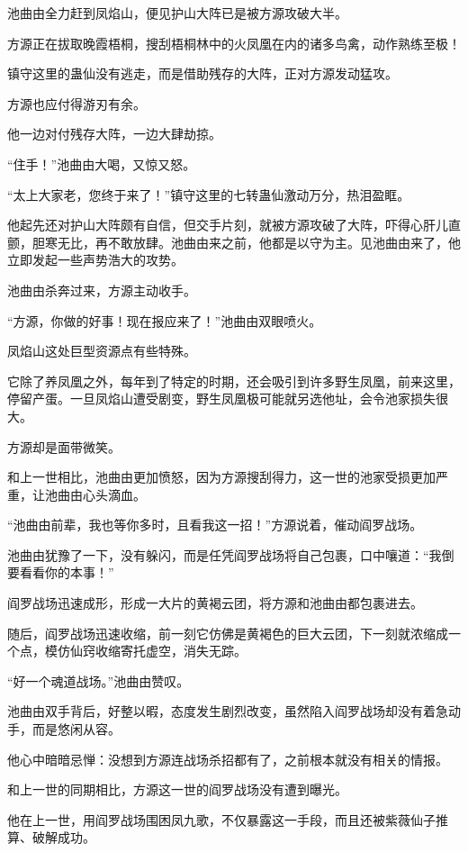 
\begin{this_body}

池曲由全力赶到凤焰山，便见护山大阵已是被方源攻破大半。

方源正在拔取晚霞梧桐，搜刮梧桐林中的火凤凰在内的诸多鸟禽，动作熟练至极！

镇守这里的蛊仙没有逃走，而是借助残存的大阵，正对方源发动猛攻。

方源也应付得游刃有余。

他一边对付残存大阵，一边大肆劫掠。

“住手！”池曲由大喝，又惊又怒。

“太上大家老，您终于来了！”镇守这里的七转蛊仙激动万分，热泪盈眶。

他起先还对护山大阵颇有自信，但交手片刻，就被方源攻破了大阵，吓得心肝儿直颤，胆寒无比，再不敢放肆。池曲由来之前，他都是以守为主。见池曲由来了，他立即发起一些声势浩大的攻势。

池曲由杀奔过来，方源主动收手。

“方源，你做的好事！现在报应来了！”池曲由双眼喷火。

凤焰山这处巨型资源点有些特殊。

它除了养凤凰之外，每年到了特定的时期，还会吸引到许多野生凤凰，前来这里，停留产蛋。一旦凤焰山遭受剧变，野生凤凰极可能就另选他址，会令池家损失很大。

方源却是面带微笑。

和上一世相比，池曲由更加愤怒，因为方源搜刮得力，这一世的池家受损更加严重，让池曲由心头滴血。

“池曲由前辈，我也等你多时，且看我这一招！”方源说着，催动阎罗战场。

池曲由犹豫了一下，没有躲闪，而是任凭阎罗战场将自己包裹，口中嚷道：“我倒要看看你的本事！”

阎罗战场迅速成形，形成一大片的黄褐云团，将方源和池曲由都包裹进去。

随后，阎罗战场迅速收缩，前一刻它仿佛是黄褐色的巨大云团，下一刻就浓缩成一个点，模仿仙窍收缩寄托虚空，消失无踪。

“好一个魂道战场。”池曲由赞叹。

池曲由双手背后，好整以暇，态度发生剧烈改变，虽然陷入阎罗战场却没有着急动手，而是悠闲从容。

他心中暗暗忌惮：没想到方源连战场杀招都有了，之前根本就没有相关的情报。

和上一世的同期相比，方源这一世的阎罗战场没有遭到曝光。

他在上一世，用阎罗战场围困凤九歌，不仅暴露这一手段，而且还被紫薇仙子推算、破解成功。


\end{this_body}
